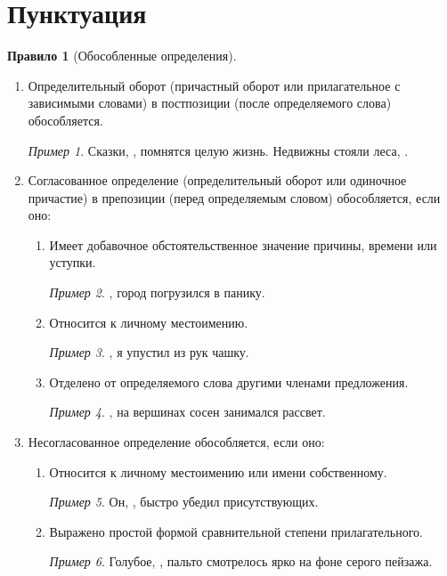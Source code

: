 \documentclass[12pt]{article}
\theoremstyle{definition}
\newtheorem{rrule}{Правило}[section]
\theoremstyle{remark}
\newtheorem*{example}{Пример}
\begin{document}
\section{Пунктуация}

\begin{rrule}[Обособленные определения]
    \hfill 
    \begin{enumerate}
        \item Определительный оборот (причастный оборот или прилагательное с зависимыми словами) в постпозиции (после определяемого слова) обособляется.
        \begin{example}
            Сказки, , помнятся целую жизнь. Недвижны стояли леса, .
        \end{example}
        \item Согласованное определение (определительный оборот или одиночное причастие) в препозиции (перед определяемым словом) обособляется, если оно:
        \begin{enumerate}
            \item Имеет добавочное обстоятельственное значение причины, времени или уступки.
            \begin{example}
                , город погрузился в панику.
            \end{example}
            \item Относится к личному местоимению.
            \begin{example}
                , я упустил из рук чашку.
            \end{example}
            \item Отделено от определяемого слова другими членами предложения.
            \begin{example}
                , на вершинах сосен занимался рассвет.
            \end{example}
        \end{enumerate}
        \item Несогласованное определение обособляется, если оно:
        \begin{enumerate}
            \item Относится к личному местоимению или имени собственному.
            \begin{example}
                Он, , быстро убедил присутствующих.
            \end{example}
            \item Выражено простой формой сравнительной степени прилагательного.
            \begin{example}
                Голубое, , пальто смотрелось ярко на фоне серого пейзажа.
            \end{example}
        \end{enumerate}
    \end{enumerate}
\end{rrule}
\end{document}

